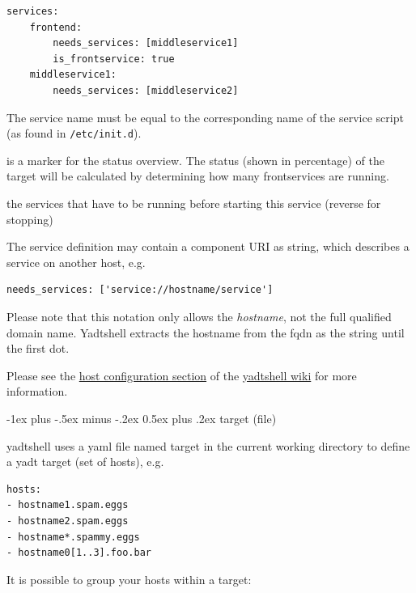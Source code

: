 \documentclass[10pt,landscape]{article}
\makeatletter
\renewcommand{\section}{\@startsection{section}{1}{0mm}%
                                {-1ex plus -.5ex minus -.2ex}%
                                {0.5ex plus .2ex}%
                                {\normalfont\large\bfseries}}
\makeatother
\begin{document}
\begin{multicols}{3}
\begin{lstlisting}[showspaces=true]
services:
    frontend:
        needs_services: [middleservice1]
        is_frontservice: true
    middleservice1:
        needs_services: [middleservice2]
\end{lstlisting}

The service name must be equal to the corresponding name of the
service script (as found in \verb+/etc/init.d+).

\begin{description}[font=\bfseries,leftmargin=1cm,style=sameline]
    \item [is\_frontservice]
    is a marker for the status overview. The status
    (shown in percentage) of the target will be
    calculated by determining how many
    frontservices are running.
\item [needs\_services]
    the services that have to be running before
    starting this service (reverse for stopping)
\end{description}

The service definition may contain a component URI as string,
which describes a service on another host, e.g.

\begin{lstlisting}
needs_services: ['service://hostname/service']
\end{lstlisting}

Please note that this notation only allows the \emph{hostname},
not the full qualified domain name. Yadtshell extracts the hostname from
the fqdn as the string until the first dot.

Please see the
\href{https://github.com/yadt/yadtshell/wiki/Host-Configuration}{host configuration section}
of the \href{https://github.com/yadt/yadtshell/wiki}{yadtshell wiki}
for more information.



\section{target (file)}

yadtshell uses a yaml file named target in the current working directory to define a yadt target (set of hosts), e.g.

\begin{lstlisting}
hosts:
- hostname1.spam.eggs
- hostname2.spam.eggs
- hostname*.spammy.eggs
- hostname0[1..3].foo.bar
\end{lstlisting}

It is possible to group your hosts within a target:


\end{multicols}
\end{document}
